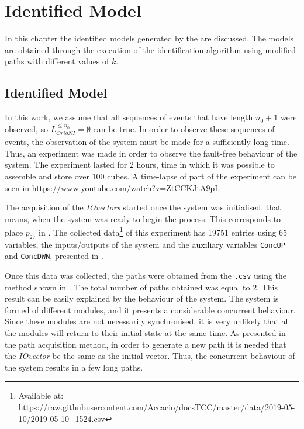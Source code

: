 \chapter{Identified Model}
\label{cha:results}
In this chapter the identified models generated by the
 are discussed. The models are obtained through the
execution of the identification algorithm using modified paths with different
values of $k$.

\section{Identified Model}
In this work, we assume that all
sequences of events that have length $n_0+1$ were observed, so 
$L_{OrigNI}^{\leq n_0}=\emptyset$ can be true. In order to observe these
sequences of events, the observation of the system must be made for a sufficiently
long time. Thus, an experiment was made in order to observe the fault-free
behaviour of the system. The experiment lasted for 2
hours, time in which it was possible to assemble and store over 100 cubes. A time-lapse of part of the experiment can be seen in
\url{https://www.youtube.com/watch?v=ZtCCKJtA9pI}.

The acquisition of the \emph{IOvectors} started once the system was initialised, that means,
when the system was ready to begin the process. This corresponds to place
\hyperlink{partialTable:p27}{$p_{27}$} in .
The collected data\footnote{Available at:
  \url{https://raw.githubusercontent.com/Accacio/docsTCC/master/data/2019-05-10/2019-05-10_1524.csv}}
of this experiment has 19751 entries using 65
variables, the inputs\slash outputs of the system and the auxiliary variables
\verb|ConcUP| and \verb|ConcDWN|, presented in .

Once this data was collected, the paths were obtained from the \verb|.csv| using
the method shown in . The total number of paths obtained was equal to
2. This result can be easily explained by the behaviour of the system. The
system is formed of different modules, and it presents a considerable concurrent behaviour. Since these modules are not necessarily
synchronised, it is very unlikely that all the modules will return to their initial
state at the same time. As presented in the path acquisition method, in order to generate
a new path it is needed that the \emph{IOvector} be the same as the initial
vector. Thus, the concurrent behaviour of the system results in a few long paths. 


